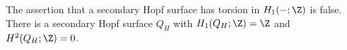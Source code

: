 
\begin{proposition}\hypertarget{tag-01F9}{}\label{cdp:st:C.3.3}



The assertion that a secondary Hopf surface has torsion in
$H_1(-;\Z)$ is false. There is a secondary Hopf surface $Q_H$ with
$H_1(Q_H;\Z)=\Z$ and $H^2(Q_H;\Z)=0$.
\end{proposition}

